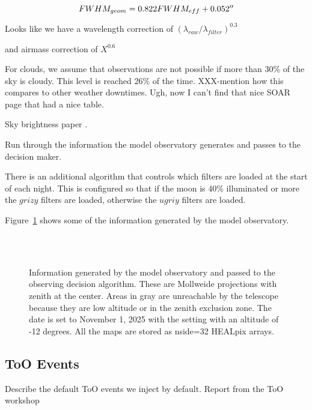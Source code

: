 \documentclass[]{aastex631}
\begin{document}
\begin{equation}
    FWHM_{geom} = 0.822 FWHM_{eff} + 0.052\arcsec
\end{equation}

Looks like we have a wavelength correction of $(\lambda_{raw}/\lambda_{filter})^{0.3}$

and airmass correction of $X^{0.6}$

For clouds, we assume that observations are not possible if more than 30\% of the sky is cloudy. This level is reached 26\% of the time. XXX-mention how this compares to other weather downtimes. Ugh, now I can't find that nice SOAR page that had a nice table.

Sky brightness paper \citep{Yoachim2016}. 


Run through the information the model observatory generates and passes to the decision maker.

There is an additional algorithm that controls which filters are loaded at the start of each night. This is configured so that if the moon is 40\% illuminated or more the $grizy$ filters are loaded, otherwise the $ugriy$ filters are loaded.

Figure~\ref{fig:conditions} shows some of the information generated by the model observatory. 

\begin{figure}
     \\
     \\
    \caption{Information generated by the model observatory and passed to the observing decision algorithm. These are Mollweide projections with zenith at the center. Areas in gray are unreachable by the telescope because they are low altitude or in the zenith exclusion zone. The date is set to November 1, 2025 with the setting with an altitude of -12 degrees. All the maps are stored as nside=32 HEALpix arrays. }
    \label{fig:conditions}
\end{figure}

\subsection{ToO Events}

Describe the default ToO events we inject by default. Report from the ToO workshop \citep{Andreoni2022}
\end{document}
